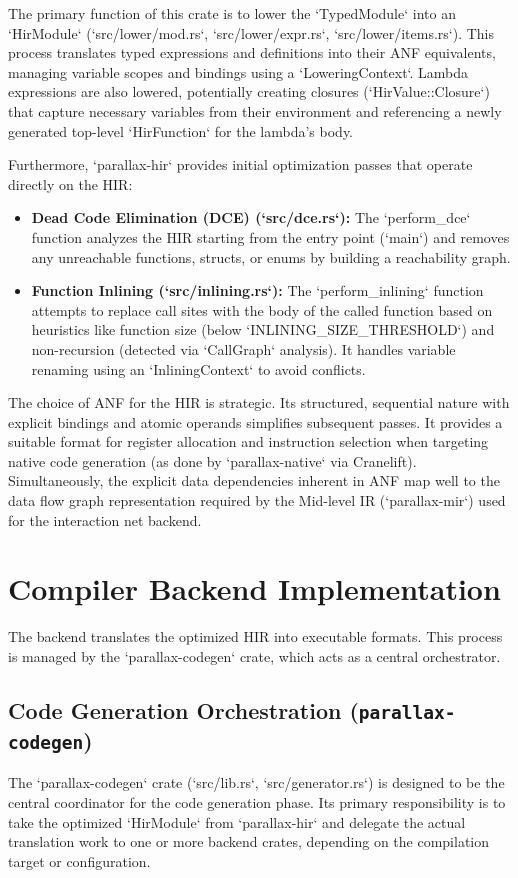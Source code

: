 The primary function of this crate is to lower the `TypedModule` into an `HirModule` (`src/lower/mod.rs`, `src/lower/expr.rs`, `src/lower/items.rs`). This process translates typed expressions and definitions into their ANF equivalents, managing variable scopes and bindings using a `LoweringContext`. Lambda expressions are also lowered, potentially creating closures (`HirValue::Closure`) that capture necessary variables from their environment and referencing a newly generated top-level `HirFunction` for the lambda's body.

Furthermore, `parallax-hir` provides initial optimization passes that operate directly on the HIR:
\begin{itemize}
    \item \textbf{Dead Code Elimination (DCE) (`src/dce.rs`):} The `perform_dce` function analyzes the HIR starting from the entry point (`main`) and removes any unreachable functions, structs, or enums by building a reachability graph.
    \item \textbf{Function Inlining (`src/inlining.rs`):} The `perform_inlining` function attempts to replace call sites with the body of the called function based on heuristics like function size (below `INLINING_SIZE_THRESHOLD`) and non-recursion (detected via `CallGraph` analysis). It handles variable renaming using an `InliningContext` to avoid conflicts.
\end{itemize}

The choice of ANF for the HIR is strategic. Its structured, sequential nature with explicit bindings and atomic operands simplifies subsequent passes. It provides a suitable format for register allocation and instruction selection when targeting native code generation (as done by `parallax-native` via Cranelift). Simultaneously, the explicit data dependencies inherent in ANF map well to the data flow graph representation required by the Mid-level IR (`parallax-mir`) used for the interaction net backend.

\section{Compiler Backend Implementation} %
The backend translates the optimized HIR into executable formats. This process is managed by the `parallax-codegen` crate, which acts as a central orchestrator.

\subsection{Code Generation Orchestration (\texttt{parallax-codegen})} %
The `parallax-codegen` crate (`src/lib.rs`, `src/generator.rs`) is designed to be the central coordinator for the code generation phase. Its primary responsibility is to take the optimized `HirModule` from `parallax-hir` and delegate the actual translation work to one or more backend crates, depending on the compilation target or configuration.

